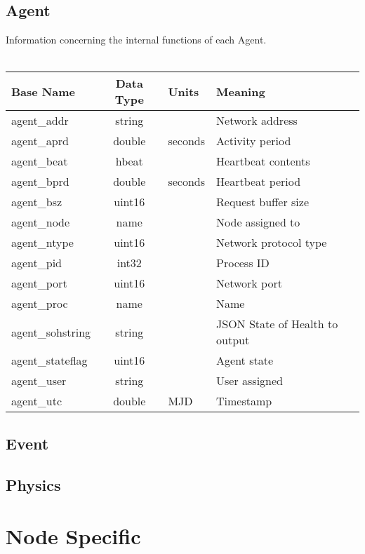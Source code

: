\documentclass[10pt,letterpaper]{report}
\begin{document}
\subsection{Agent}
Information concerning the internal functions of each Agent.
\\
\\
\begin{tabular}{|l|c|l|l|}
\hline \textbf{Base Name} &\textbf{Data Type}  & \textbf{Units} & \textbf{Meaning}\\ 
\hline agent\_addr & string &  & Network address \\ 
\hline agent\_aprd & double & seconds & Activity period \\ 
\hline agent\_beat & hbeat &  & Heartbeat contents \\ 
\hline agent\_bprd & double & seconds & Heartbeat period \\ 
\hline agent\_bsz & uint16 &  & Request buffer size \\ 
\hline agent\_node & name &  & Node assigned to \\ 
\hline agent\_ntype & uint16 &  & Network protocol type \\ 
\hline agent\_pid & int32 &  & Process ID \\ 
\hline agent\_port & uint16 &  & Network port \\ 
\hline agent\_proc & name &  & Name \\ 
\hline agent\_sohstring & string &  & JSON State of Health to output \\ 
\hline agent\_stateflag & uint16 &  & Agent state \\ 
\hline agent\_user & string &  & User assigned \\ 
\hline agent\_utc & double & MJD & Timestamp \\ 
\hline 
\end{tabular} 
\subsection{Event}
\subsection{Physics}
\section{Node Specific}
\end{document}

